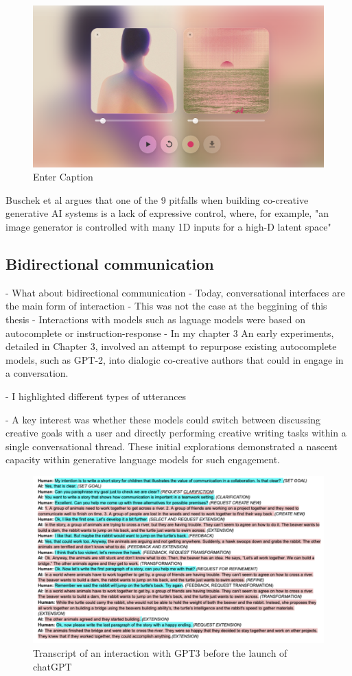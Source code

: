 \begin{figure}
    \centering
    \includegraphics[width=1\linewidth]{vibesynth.png}
    \caption{Enter Caption}
    \label{fig:enter-label}
\end{figure}


Buschek et al \cite{Buschek2021-ks} argues that one of the 9 pitfalls when building co-creative generative AI systems is a lack of expressive control, where, for example, "an image generator is controlled with
many 1D inputs for a high-D latent space"

\subsection{Bidirectional communication}

- What about bidirectional communication
- Today, conversational interfaces are the main form of interaction
- This was not the case at the beggining of this thesis
- Interactions with models such as laguage models were based on autocomplete or instruction-response
- In my chapter 3 An early experiments, detailed in Chapter 3, involved an attempt to repurpose existing autocomplete models, such as GPT-2, into dialogic co-creative authors that could in engage in a conversation. 

- I highlighted different types of utterances

- A key interest was whether these models could switch between discussing creative goals with a user and directly performing creative writing tasks within a single conversational thread. These initial explorations demonstrated a nascent capacity within generative language models for such engagement.

\begin{figure}
    \centering
    \includegraphics[width=0.5\linewidth]{transcriptgenchi.png}
    \caption{Transcript of an interaction with GPT3 before the launch of chatGPT}
    \label{fig:enter-label}
\end{figure}

